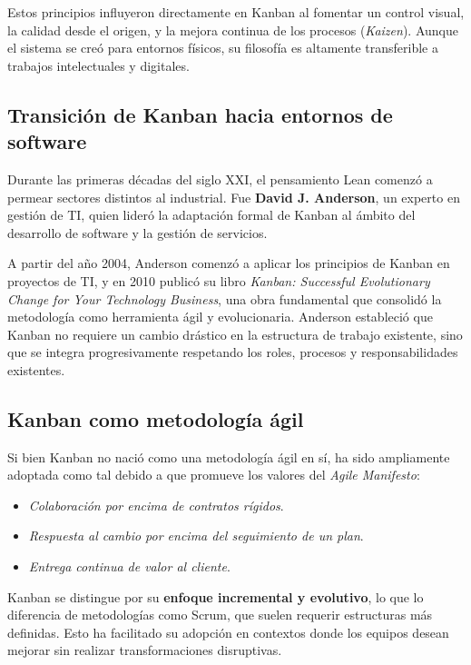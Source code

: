 Estos principios influyeron directamente en Kanban al fomentar un control visual, la calidad desde el origen, y la mejora continua de los procesos (\textit{Kaizen}). Aunque el sistema se creó para entornos físicos, su filosofía es altamente transferible a trabajos intelectuales y digitales.

\subsection{Transición de Kanban hacia entornos de software}

Durante las primeras décadas del siglo XXI, el pensamiento Lean comenzó a permear sectores distintos al industrial. Fue \textbf{David J. Anderson}, un experto en gestión de TI, quien lideró la adaptación formal de Kanban al ámbito del desarrollo de software y la gestión de servicios.

A partir del año 2004, Anderson comenzó a aplicar los principios de Kanban en proyectos de TI, y en 2010 publicó su libro \textit{Kanban: Successful Evolutionary Change for Your Technology Business}, una obra fundamental que consolidó la metodología como herramienta ágil y evolucionaria. Anderson estableció que Kanban no requiere un cambio drástico en la estructura de trabajo existente, sino que se integra progresivamente respetando los roles, procesos y responsabilidades existentes.

\subsection{Kanban como metodología ágil}

Si bien Kanban no nació como una metodología ágil en sí, ha sido ampliamente adoptada como tal debido a que promueve los valores del \textit{Agile Manifesto}:
\begin{itemize}
    \item \textit{Colaboración por encima de contratos rígidos}.
    \item \textit{Respuesta al cambio por encima del seguimiento de un plan}.
    \item \textit{Entrega continua de valor al cliente}.
\end{itemize}

Kanban se distingue por su \textbf{enfoque incremental y evolutivo}, lo que lo diferencia de metodologías como Scrum, que suelen requerir estructuras más definidas. Esto ha facilitado su adopción en contextos donde los equipos desean mejorar sin realizar transformaciones disruptivas.

